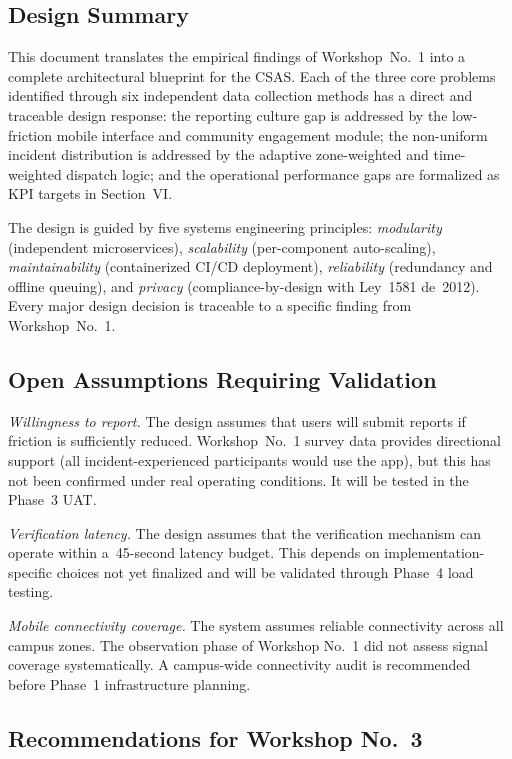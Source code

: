 \documentclass[10pt,twocolumn]{article}
\begin{document}
\subsection{Design Summary}

This document translates the empirical findings of Workshop~No.~1 into
a complete architectural blueprint for the CSAS. Each of the three core
problems identified through six independent data collection methods has
a direct and traceable design response: the reporting culture gap is
addressed by the low-friction mobile interface and community engagement
module; the non-uniform incident distribution is addressed by the
adaptive zone-weighted and time-weighted dispatch logic; and the
operational performance gaps are formalized as KPI targets in
Section~VI.

The design is guided by five systems engineering principles:
\textit{modularity} (independent microservices), \textit{scalability}
(per-component auto-scaling), \textit{maintainability} (containerized
CI/CD deployment), \textit{reliability} (redundancy and offline
queuing), and \textit{privacy} (compliance-by-design with Ley~1581
de~2012). Every major design decision is traceable to a specific
finding from Workshop~No.~1.

\subsection{Open Assumptions Requiring Validation}

\textit{Willingness to report.} The design assumes that users will
submit reports if friction is sufficiently reduced. Workshop~No.~1
survey data provides directional support (all incident-experienced
participants would use the app), but this has not been confirmed under
real operating conditions. It will be tested in the Phase~3 UAT.

\textit{Verification latency.} The design assumes that the verification
mechanism can operate within a~45-second latency budget. This depends on
implementation-specific choices not yet finalized and will be validated
through Phase~4 load testing.

\textit{Mobile connectivity coverage.} The system assumes reliable
connectivity across all campus zones. The observation phase of Workshop
No.~1 did not assess signal coverage systematically. A campus-wide
connectivity audit is recommended before Phase~1 infrastructure
planning.

\subsection{Recommendations for Workshop No.~3}
\end{document}
